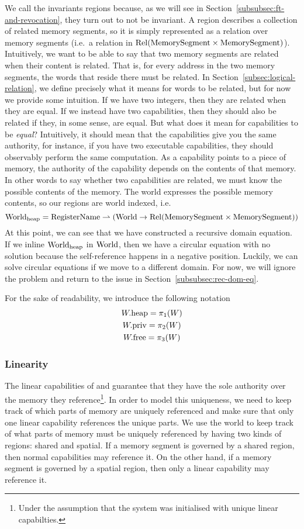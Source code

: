 \begin{jversion}
We call the invariants regions because, as we will see in Section~\ref{subsubsec:ft-and-revocation}, they turn out to not be invariant.
A region describes a collection of related memory segments, so it is simply represented as a relation over memory segments (i.e.\ a relation in $\mathrm{Rel}(\mathrm{MemorySegment} \times \mathrm{MemorySegment})$).
Intuitively, we want to be able to say that two memory segments are related when their content is related.
That is, for every address in the two memory segments, the words that reside there must be related.
In Section~\ref{subsec:logical-relation}, we define precisely what it means for words to be related, but for now we provide some intuition.
If we have two integers, then they are related when they are equal.
If we instead have two capabilities, then they should also be related if they, in some sense, are equal.
But what does it mean for capabilities to be \textit{equal}?
Intuitively, it should mean that the capabilities give you the same authority, for instance, if you have two executable capabilities, they should observably perform the same computation.
As a capability points to a piece of memory, the authority of the capability depends on the contents of that memory.
In other words to say whether two capabilities are related, we must know the possible contents of the memory.
The world expresses the possible memory contents, so our regions are world indexed, i.e.
\[
  \mathrm{World}_\mathrm{heap} = \mathrm{RegisterName} \rightharpoonup (\mathrm{World} \rightarrow \mathrm{Rel}(\mathrm{MemorySegment} \times \mathrm{MemorySegment}))
\]
At this point, we can see that we have constructed a recursive domain equation.
If we inline $\mathrm{World}_\mathrm{heap}$ in $\mathrm{World}$, then we have a circular equation with no solution because the self-reference happens in a negative position.
Luckily, we can solve circular equations if we move to a different domain.
For now, we will ignore the problem and return to the issue in Section~\ref{subsubsec:rec-dom-eq}.

For the sake of readability, we introduce the following notation
\begin{gather*}
  W.\mathrm{heap} = \pi_1(W)\\
  W.\mathrm{priv} = \pi_2(W)\\
  W.\mathrm{free} = \pi_3(W)
\end{gather*}
\subsubsection{Linearity}
The linear capabilities of \srccm{} and \trgcm{} guarantee that they have the sole authority over the memory they reference\footnote{Under the assumption that the system was initialised with unique linear capabilties.}.
In order to model this uniqueness, we need to keep track of which parts of memory are uniquely referenced and make sure that only one linear capability references the unique parts.
We use the world to keep track of what parts of memory must be uniquely referenced by having two kinds of regions: shared and spatial.
If a memory segment is governed by a shared region, then normal capabilities may reference it.
On the other hand, if a memory segment is governed by a spatial region, then only a linear capability may reference it.


\end{jversion}
